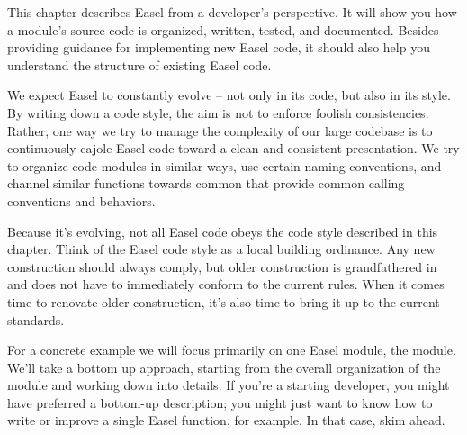 
This chapter describes Easel from a developer's perspective. It will
show you how a module's source code is organized, written, tested, and
documented. Besides providing guidance for implementing new Easel
code, it should also help you understand the structure of existing
Easel code.

We expect Easel to constantly evolve -- not only in its code, but also
in its style. By writing down a code style, the aim is not to enforce
foolish consistencies. Rather, one way we try to manage the complexity
of our large codebase is to continuously cajole Easel code toward a
clean and consistent presentation. We try to organize code modules in
similar ways, use certain naming conventions, and channel similar
functions towards common  that provide common
calling conventions and behaviors. 

Because it's evolving, not all Easel code obeys the code style
described in this chapter. Think of the Easel code style as a local
building ordinance. Any new construction should always comply, but
older construction is grandfathered in and does not have to
immediately conform to the current rules. When it comes time to
renovate older construction, it's also time to bring it up to the
current standards.

For a concrete example we will focus primarily on one Easel module,
the  module. We'll take a bottom up approach, starting
from the overall organization of the module and working down into
details. If you're a starting developer, you might have preferred a
bottom-up description; you might just want to know how to write or
improve a single Easel function, for example. In that case, skim
ahead.

